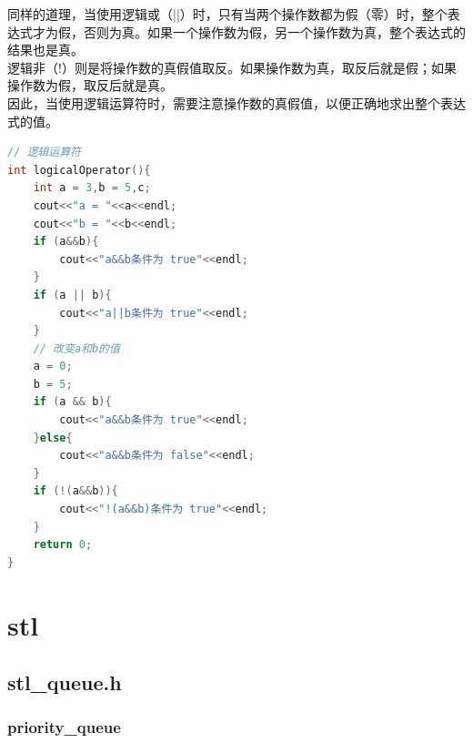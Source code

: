 \documentclass[12pt,twiside,a4paper]{ctexbook}
\numberwithin{chapter}{part}
\begin{document}
同样的道理，当使用逻辑或（||）时，只有当两个操作数都为假（零）时，整个表达式才为假，否则为真。如果一个操作数为假，另一个操作数为真，整个表达式的结果也是真。\\
逻辑非（!）则是将操作数的真假值取反。如果操作数为真，取反后就是假；如果操作数为假，取反后就是真。\\
因此，当使用逻辑运算符时，需要注意操作数的真假值，以便正确地求出整个表达式的值。
\begin{lstlisting}[language=C++]
// 逻辑运算符
int logicalOperator(){
	int a = 3,b = 5,c;
	cout<<"a = "<<a<<endl;
	cout<<"b = "<<b<<endl;
	if (a&&b){
		cout<<"a&&b条件为 true"<<endl;
	}
	if (a || b){
		cout<<"a||b条件为 true"<<endl;
	}
	// 改变a和b的值
	a = 0;
	b = 5;
	if (a && b){
		cout<<"a&&b条件为 true"<<endl;
	}else{
		cout<<"a&&b条件为 false"<<endl;
	}
	if (!(a&&b)){
		cout<<"!(a&&b)条件为 true"<<endl;
	}
	return 0;
}
\end{lstlisting}

\chapter{stl}
\section{stl\_queue.h}
\subsection{priority\_queue}
\end{document}
